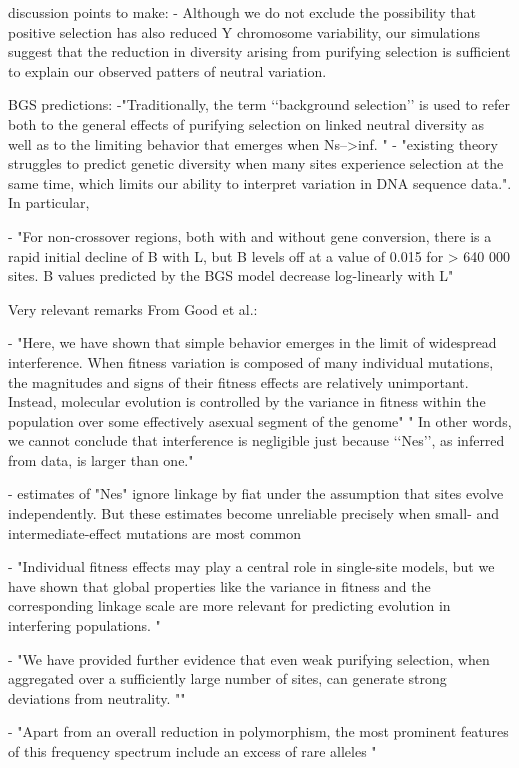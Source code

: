 \documentclass[9pt,twocolumn,twoside]{gsajnl}
\begin{document}
discussion points to make:
- Although we do not exclude the possibility that positive selection has also reduced Y chromosome variability, our simulations suggest that the reduction in diversity arising from purifying selection is sufficient to explain our observed patters of neutral variation.

BGS predictions:
-"Traditionally, the term ‘‘background selection’’ is used to refer both to the general effects of purifying selection on linked neutral diversity as well as to the limiting behavior that emerges when Ns-->inf. "
- "existing theory struggles to predict genetic diversity when many sites experience selection at the same time, which limits our ability to interpret variation in DNA sequence data.". In particular,

- "For non-crossover regions, both with and without gene conversion, there is a rapid initial decline of B with L, but B levels off at a value of  0.015 for > 640 000 sites. B values predicted by the BGS model decrease log-linearly with L"

Very relevant remarks From Good et al.:

- "Here, we have shown that simple behavior emerges in the limit of widespread interference. When fitness variation is composed of many individual mutations, the magnitudes and signs of their fitness effects are relatively unimportant. Instead, molecular evolution is controlled by the variance in fitness within the population over some effectively asexual segment of the genome" " In other words, we cannot conclude that interference is negligible just because ‘‘Nes’’, as inferred from data, is larger than one."

- estimates of "Nes" ignore linkage by fiat under the assumption that sites evolve independently. But these estimates become unreliable precisely when small- and intermediate-effect mutations are most common

- "Individual fitness effects may play a central role in single-site models, but we have shown that global properties like the variance in fitness and the corresponding linkage scale are more relevant for predicting evolution in interfering populations. "

- "We have provided further evidence that even weak purifying selection, when aggregated over a sufficiently large number of sites, can generate strong deviations from neutrality. ""

- "Apart from an overall reduction in polymorphism, the most prominent features of this frequency spectrum include an excess of rare alleles "
\end{document}

